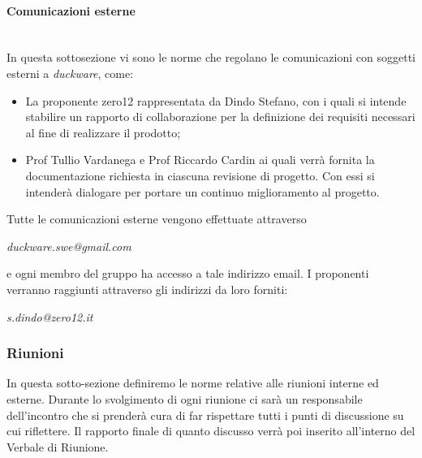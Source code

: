 \paragraph{Comunicazioni esterne}\mbox{}\\[0.4cm]
In questa sottosezione vi sono le norme che regolano le comunicazioni con soggetti esterni a \emph{duckware}, come:
\begin{itemize}    
    \item La proponente zero12 rappresentata da Dindo Stefano, con i quali si intende stabilire un rapporto di collaborazione per la definizione dei requisiti necessari al fine di realizzare il prodotto;
    \item Prof Tullio Vardanega e Prof Riccardo Cardin ai quali verrà fornita la documentazione richiesta in ciascuna revisione di progetto. Con essi si intenderà dialogare per portare un continuo miglioramento al progetto.
\end{itemize}
Tutte le comunicazioni esterne vengono effettuate attraverso
\begin{center}
\emph{duckware.swe@gmail.com}
\end{center}
e ogni membro del gruppo ha accesso a tale indirizzo email. I proponenti verranno raggiunti attraverso gli indirizzi da loro forniti:
\begin{center}
\emph{s.dindo@zero12.it}
\end{center}

\subsubsection{Riunioni}
In questa sotto-sezione definiremo le norme relative alle riunioni interne ed esterne. Durante lo svolgimento di ogni riunione ci sarà un responsabile dell’incontro che si prenderà cura di far rispettare tutti i punti di discussione su cui riflettere. Il rapporto finale di quanto discusso verrà poi inserito all’interno del Verbale di Riunione. 

